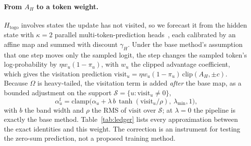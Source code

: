 \documentclass[runningheads]{llncs}
\newcommand{\Htogo}{H_{\mathrm{togo}}}
\newcommand{\AH}{A_{H}}
\newcommand{\Om}{\Omega}
\begin{document}
\paragraph{From $\AH$ to a token weight.} $\Htogo$ involves states the update has not
visited, so we forecast it from the hidden state with $\kappa = 2$ parallel
multi-token-prediction heads~\cite{medusa}, each calibrated by an affine map and summed
with discount $\gamma_H$. Under the base method's assumption that one step moves only the sampled
logit, the step changes the sampled token's log-probability by $\eta w_u (1 - \pi_u)$,
with $w_u$ the clipped advantage coefficient, which gives the visitation prediction
$\mathrm{visit}_u = \eta w_u (1-\pi_u)\,\mathrm{clip}(\AH, \pm c)$. Because $\Om$ is
heavy-tailed, the visitation term is added \emph{after} the base map, as a bounded
adjustment on the support $\mathcal{S} = \{u : \mathrm{visit}_u \ne 0\}$,
\begin{equation}
\alpha^{\mathrm{f}}_u = \mathrm{clamp}\bigl(\alpha_u
  + \lambda\, b\, \tanh(\mathrm{visit}_u / \rho),\ \lambda_{\min}, 1\bigr),
\label{eq:combine}
\end{equation}
with $b$ the band width and $\rho$ the RMS of $\mathrm{visit}$ over $\mathcal{S}$; at
$\lambda = 0$ the pipeline is exactly the base method. Table~\ref{tab:ledger} lists
every approximation between the exact identities and this weight. The correction is an
instrument for testing the zero-sum prediction, not a proposed training method.
\end{document}
